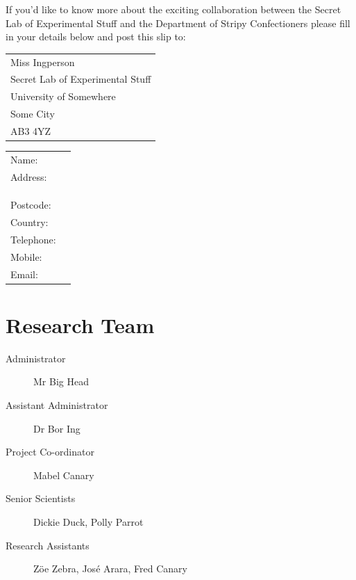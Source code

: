 \documentclass[a4paper,12pt,notumble]{leaflet}
\begin{document}
If you'd like to know more about the exciting collaboration between
the Secret Lab of Experimental Stuff and the Department of Stripy
Confectioners please fill in your details below and post this slip to:

\bigskip

\begin{tabular}{@{}l}
Miss Ingperson\\
Secret Lab of Experimental Stuff\\
University of Somewhere\\
Some City\\
AB3 4YZ
\end{tabular} 






\begin{tabular}{@{}lp{4cm}}
Name: & \dotfill \\
Address: & \dotfill\\
 & \dotfill \\
 & \dotfill \\
 & \dotfill \\
Postcode: & \dotfill\\
Country: & \dotfill\\
Telephone: & \dotfill\\
Mobile: & \dotfill\\
Email: & \dotfill
\end{tabular}

\newpage

\section{Research Team}

\begin{description}
\item[Administrator] Mr Big Head

\item[Assistant Administrator] Dr Bor Ing

\item[Project Co-ordinator] Mabel Canary

\item[Senior Scientists] Dickie Duck, Polly Parrot

\item[Research Assistants] Zöe Zebra, José Arara, Fred Canary

\end{description}
\end{document}
